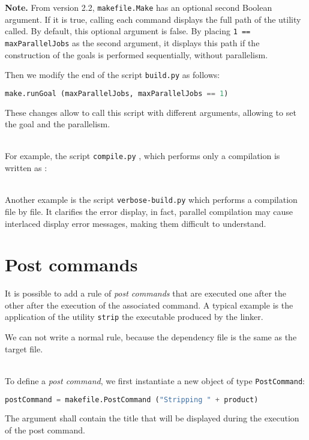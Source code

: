 \documentclass[a4paper,11pt]{extarticle}
\begin{document}
{\bf Note.}\label{logUtilityToolPath2} From version 2.2, \texttt{makefile.Make}  has an optional second Boolean argument. If it is true, calling each command displays the full path of the utility called. By default, this optional argument is false. By placing \texttt{1 == maxParallelJobs} as the second argument, it displays this path if the construction of the goals is performed sequentially, without parallelism.

Then we modify the end of the script \texttt{build.py}  as follows:
\begin{lstlisting}[language=py]
make.runGoal (maxParallelJobs, maxParallelJobs == 1)
\end{lstlisting}

These changes allow to call this script with different arguments, allowing to set the goal and the parallelism.

~\\For example, the script \texttt{compile.py} , which performs only a compilation is written as :



~\\Another example is the script \texttt{verbose-build.py}  which performs a compilation file by file. It clarifies the error display, in fact, parallel compilation may cause interlaced display error messages, making them difficult to understand.








\section{Post commands}

It is possible to add a rule of \emph{post commands} that are executed one after the other after the execution of the associated command. A typical example is the application of the utility \texttt{strip} the executable produced by the linker.

We can not write a normal rule, because the dependency file is the same as the target file.

~\\To define a \emph{post command}, we first instantiate a new object of type \texttt{PostCommand}:
\begin{lstlisting}[language=py]
postCommand = makefile.PostCommand ("Stripping " + product)
\end{lstlisting}
The argument shall contain the title that will be displayed during the execution of the post command.
\end{document}
